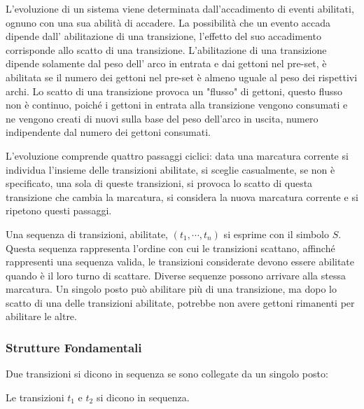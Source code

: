 \documentclass{article}
\numberwithin{equation}{subsection}
\begin{document}
L'evoluzione di un sistema viene determinata dall'accadimento di eventi abilitati, ognuno con una sua abilità di accadere. La possibilità che un evento accada dipende dall'
abilitazione di una transizione, l'effetto del suo accadimento corrisponde allo scatto di una transizione. L'abilitazione di una transizione dipende solamente dal peso dell'
arco in entrata e dai gettoni nel pre-set, è abilitata se il numero dei gettoni nel pre-set è almeno uguale al peso dei rispettivi archi. 
Lo scatto di una transizione provoca un "flusso" di gettoni, questo flusso non è continuo, poiché i gettoni in entrata alla transizione vengono consumati e ne vengono creati 
di nuovi sulla base del peso dell'arco in uscita, numero indipendente dal numero dei gettoni consumati. 

L'evoluzione comprende quattro passaggi ciclici: data una marcatura corrente si individua l'insieme delle transizioni abilitate, si sceglie casualmente, se non è specificato, 
una sola di queste transizioni, si provoca lo scatto di questa transizione che cambia la marcatura, si considera la nuova marcatura corrente e si ripetono questi passaggi. 

Una sequenza di transizioni, abilitate, $(t_1,\cdots,t_n)$ si esprime con il simbolo $S$. Questa sequenza rappresenta l'ordine con cui le transizioni scattano, affinché 
rappresenti una sequenza valida, le transizioni considerate devono essere abilitate quando è il loro turno di scattare. Diverse sequenze possono arrivare alla stessa 
marcatura. 
Un singolo posto può abilitare più di una transizione, ma dopo lo scatto di una delle transizioni abilitate, potrebbe non avere gettoni rimanenti per abilitare le altre. 

\subsubsection{Strutture Fondamentali}

Due transizioni si dicono in sequenza se sono collegate da un singolo posto:
\begin{center}
\end{center}
Le transizioni $t_1$ e $t_2$ si dicono in sequenza. 
\end{document}
